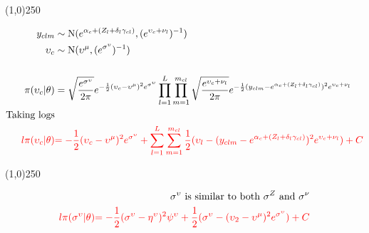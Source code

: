 \begin{center}
\line(1,0){250}
\end{center}

\begin{align*}
y_{clm} &\sim \operatorname{N}(e^{\alpha_{c}+(Z_{l}+\delta_{l}\gamma_{cl})},(e^{ \upsilon_{c}+\nu_{l} })^{-1})\\
\upsilon_{c} &\sim \operatorname{N}(\upsilon^{\mu},({e^{\sigma^{\upsilon}}})^{-1})\\
\\
\pi(\upsilon_{c}|\theta)&=\sqrt{\frac{e^{{\sigma}^{\upsilon}}}{2\pi}} e^{-\frac{1}{2}(\upsilon_{c}-\upsilon^{\mu})^{2}e^{{\sigma}^{\upsilon}} }
\prod_{l=1}^{L}\prod_{m=1}^{m_{cl}}\sqrt{\frac{e^{ \upsilon_{c}+\nu_{l} }}{2\pi}} e^{-\frac{1}{2}(y_{clm}-e^{\alpha_{c}+(Z_{l}+\delta_{l}\gamma_{cl})})^{2}e^{ \upsilon_{c}+\nu_{l} } }\\
\text{Taking logs}\\
\color{red}{l\pi(\upsilon_{c}|\theta)}&
\color{red}{
=-\frac{1}{2}(\upsilon_{c}-\upsilon^{\mu})^{2}e^{\sigma^{\upsilon}}
+
\sum_{l=1}^{L}\sum_{m=1}^{m_{cl}}\frac{1}{2}(\upsilon_{l} -(y_{clm}-e^{\alpha_{c}+(Z_{l}+\delta_{l}\gamma_{cl})})^{2}e^{\upsilon_{c}+\nu_{l}})
+C
}
\end{align*}


\begin{center}
\line(1,0){250}
\end{center}


\begin{align*}
\text{$\sigma^{\upsilon}$ is similar to both $\sigma^{Z}$ and $\sigma^{\nu}$}\\
\color{red}{l\pi(\sigma^{\upsilon}|\theta)}
\color{red}{
=-\frac{1}{2}(\sigma^{\upsilon}-\eta^{\upsilon})^{2}\psi^{\upsilon}
+
\frac{1}{2}(\sigma^{\upsilon} -(\upsilon_{2}-\upsilon^{\mu})^{2}e^{\sigma^{\upsilon}})
+C}
\end{align*}

